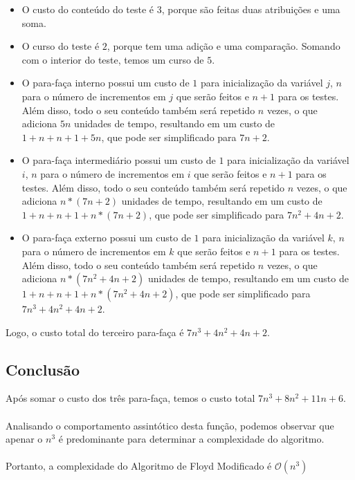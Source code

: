 \documentclass[a4paper,12pt]{article}
\begin{document}
\begin{itemize}
    \item O custo do conteúdo do teste é $3$, porque são feitas duas atribuições e uma soma.
    
    \item O curso do teste é $2$, porque tem uma adição e uma comparação. Somando com o interior do teste, temos um curso de $5$.
    
    \item O para-faça interno possui um custo de $1$ para inicialização da variável $j$, $n$ para o número de incrementos em $j$ que serão feitos e $n+1$ para os testes. Além disso, todo o seu conteúdo também será repetido $n$ vezes, o que adiciona $5n$ unidades de tempo, resultando em um custo de $1+n+n+1+5n$, que pode ser simplificado para $7n+2$.
    
    \item O para-faça intermediário possui um custo de $1$ para inicialização da variável $i$, $n$ para o número de incrementos em $i$ que serão feitos e $n+1$ para os testes. Além disso, todo o seu conteúdo também será repetido $n$ vezes, o que adiciona $n*(7n+2)$ unidades de tempo, resultando em um custo de $1+n+n+1+n*(7n+2)$, que pode ser simplificado para $7n^2+4n+2$.
    
    \item O para-faça externo possui um custo de $1$ para inicialização da variável $k$, $n$ para o número de incrementos em $k$ que serão feitos e $n+1$ para os testes. Além disso, todo o seu conteúdo também será repetido $n$ vezes, o que adiciona $n*(7n^2+4n+2)$ unidades de tempo, resultando em um custo de $1+n+n+1+n*(7n^2+4n+2)$, que pode ser simplificado para $7n^3 + 4n^2 + 4n + 2$.
\end{itemize}
Logo, o custo total do terceiro para-faça é $7n^3 + 4n^2 + 4n + 2$.

\subsection*{Conclusão}

Após somar o custo dos três para-faça, temos o custo total $7n^3 + 8n^2 + 11n + 6$.\\\\
Analisando o comportamento assintótico desta função, podemos observar que apenar o $n^3$ é predominante para determinar a complexidade do algoritmo.\\\\
Portanto, a complexidade do Algoritmo de Floyd Modificado é $\mathcal{O}(n^3)$
\end{document}
